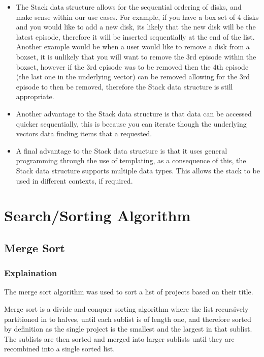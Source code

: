 \documentclass[
  english,
  a4paper,
,tablecaptionabove
]{scrartcl}
\providecommand{\tightlist}{%
  \setlength{\itemsep}{0pt}\setlength{\parskip}{0pt}}
\begin{document}
\begin{itemize}
\tightlist
\item
  The Stack data structure allows for the sequential ordering of disks,
  and make sense within our use cases. For example, if you have a box
  set of 4 disks and you would like to add a new disk, its likely that
  the new disk will be the latest episode, therefore it will be inserted
  sequentially at the end of the list. Another example would be when a
  user would like to remove a disk from a boxset, it is unlikely that
  you will want to remove the 3rd episode within the boxset, however if
  the 3rd episode was to be removed then the 4th episode (the last one
  in the underlying vector) can be removed allowing for the 3rd episode
  to then be removed, therefore the Stack data structure is still
  appropriate.
\item
  Another advantage to the Stack data structure is that data can be
  accessed quicker sequentially, this is because you can iterate though
  the underlying vectors data finding items that a requested.
\item
  A final advantage to the Stack data structure is that it uses general
  programming through the use of templating, as a consequence of this,
  the Stack data structure supports multiple data types. This allows the
  stack to be used in different contexts, if required.
\end{itemize}

\newpage

\hypertarget{searchsorting-algorithm}{%
\section{Search/Sorting Algorithm}\label{searchsorting-algorithm}}

\hypertarget{merge-sort}{%
\subsection{Merge Sort}\label{merge-sort}}

\hypertarget{explaination}{%
\subsubsection{Explaination}\label{explaination}}

The merge sort algorithm was used to sort a list of projects based on
their title.

Merge sort is a divide and conquer sorting algorithm where the list
recursively partitioned in to halves, until each sublist is of length
one, and therefore sorted by definition as the single project is the
smallest and the largest in that sublist. The sublists are then sorted
and merged into larger sublists until they are recombined into a single
sorted list.
\end{document}
